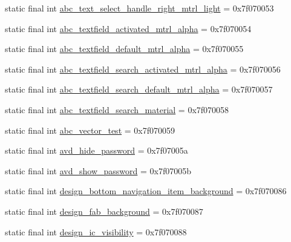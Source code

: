 \begin{DoxyCompactItemize}
static final int \mbox{\hyperlink{classandroid_1_1support_1_1design_1_1R_1_1drawable_a60a81d3c3c729bb2d56b498af413fef4}{abc\+\_\+text\+\_\+select\+\_\+handle\+\_\+right\+\_\+mtrl\+\_\+light}} = 0x7f070053
\item 
static final int \mbox{\hyperlink{classandroid_1_1support_1_1design_1_1R_1_1drawable_aa02b26fea5203408b3ddbc9b3d851b43}{abc\+\_\+textfield\+\_\+activated\+\_\+mtrl\+\_\+alpha}} = 0x7f070054
\item 
static final int \mbox{\hyperlink{classandroid_1_1support_1_1design_1_1R_1_1drawable_a83013ff30b4b94fce2e82793a1d333fe}{abc\+\_\+textfield\+\_\+default\+\_\+mtrl\+\_\+alpha}} = 0x7f070055
\item 
static final int \mbox{\hyperlink{classandroid_1_1support_1_1design_1_1R_1_1drawable_ab64a8a976522cb59b31240bf4b5e64d5}{abc\+\_\+textfield\+\_\+search\+\_\+activated\+\_\+mtrl\+\_\+alpha}} = 0x7f070056
\item 
static final int \mbox{\hyperlink{classandroid_1_1support_1_1design_1_1R_1_1drawable_ab66a327f415e4174b7123e9304719789}{abc\+\_\+textfield\+\_\+search\+\_\+default\+\_\+mtrl\+\_\+alpha}} = 0x7f070057
\item 
static final int \mbox{\hyperlink{classandroid_1_1support_1_1design_1_1R_1_1drawable_a598e8d229c729b88ac087f388a110253}{abc\+\_\+textfield\+\_\+search\+\_\+material}} = 0x7f070058
\item 
static final int \mbox{\hyperlink{classandroid_1_1support_1_1design_1_1R_1_1drawable_a534fff8a666c0ec8d9613530e8b5c245}{abc\+\_\+vector\+\_\+test}} = 0x7f070059
\item 
static final int \mbox{\hyperlink{classandroid_1_1support_1_1design_1_1R_1_1drawable_a118877575ec9c53b0d7975c4c6fbe2a0}{avd\+\_\+hide\+\_\+password}} = 0x7f07005a
\item 
static final int \mbox{\hyperlink{classandroid_1_1support_1_1design_1_1R_1_1drawable_a64264ee194e4e26ef6aac77c8261877e}{avd\+\_\+show\+\_\+password}} = 0x7f07005b
\item 
static final int \mbox{\hyperlink{classandroid_1_1support_1_1design_1_1R_1_1drawable_ab6171fe7256feb28766b462a220f08e7}{design\+\_\+bottom\+\_\+navigation\+\_\+item\+\_\+background}} = 0x7f070086
\item 
static final int \mbox{\hyperlink{classandroid_1_1support_1_1design_1_1R_1_1drawable_a0d7cbbfe5f73f4ebc521ac3831a8f7fa}{design\+\_\+fab\+\_\+background}} = 0x7f070087
\item 
static final int \mbox{\hyperlink{classandroid_1_1support_1_1design_1_1R_1_1drawable_a587fde5e3de93a6423e1bb577f382909}{design\+\_\+ic\+\_\+visibility}} = 0x7f070088

\end{DoxyCompactItemize}
